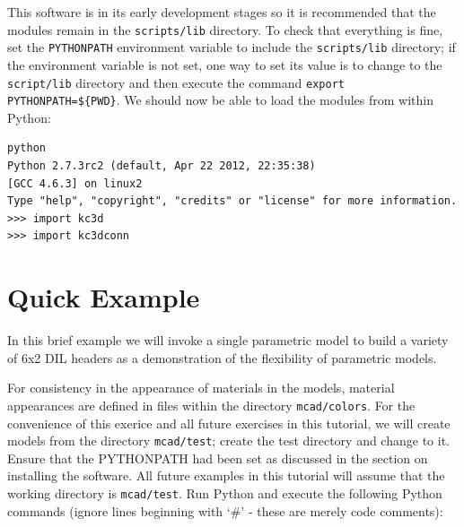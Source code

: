 This software is in its early development stages so it is recommended that the modules
remain in the \verb#scripts/lib# directory. To check that everything is fine, set the
\verb#PYTHONPATH# environment variable to include the \verb#scripts/lib# directory;
if the environment variable is not set, one way to set its value is to change to the
\verb#script/lib# directory and then execute the command \verb#export PYTHONPATH=${PWD}#.
We should now be able to load the modules from within Python:

\begin{verbatim}
python
Python 2.7.3rc2 (default, Apr 22 2012, 22:35:38) 
[GCC 4.6.3] on linux2
Type "help", "copyright", "credits" or "license" for more information.
>>> import kc3d
>>> import kc3dconn
\end{verbatim}

\section{Quick Example}
\label{sec:quick-example}
In this brief example we will invoke a single parametric model to
build a variety of 6x2 DIL headers as a demonstration of the
flexibility of parametric models.

For consistency in the appearance of materials in the models, material
appearances are defined in files within the directory \verb#mcad/colors#.
For the convenience of this exerice and all future exercises in this
tutorial, we will create models from the directory \verb#mcad/test#;
create the test directory and change to it. Ensure that the PYTHONPATH
had been set as discussed in the section on installing the software.
All future examples in this tutorial will assume that the working
directory is \verb#mcad/test#.
Run Python and execute the following Python commands (ignore lines
beginning with `\#' - these are merely code comments):

